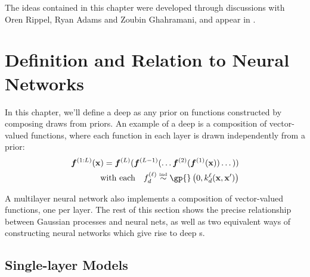 The ideas contained in this chapter were developed through discussions with Oren Rippel, Ryan Adams and Zoubin Ghahramani, and appear in \citet{DuvRipAdaGha14}.



\section{Definition and Relation to Neural Networks}
\label{sec:relating}

In this chapter, we'll define a deep \gp{} as any prior on functions constructed by composing draws from \gp{} priors.
An example of a deep \gp{} is a composition of vector-valued functions, where each function in each layer is drawn independently from a \gp{} prior:
%
\begin{align}
\vf^{(1:L)}(\vx) = \vf^{(L)}(\vf^{(L-1)}(\dots \vf^{(2)}(\vf^{(1)}(\vx)) \dots)) \\
\textnormal{with each} \quad f_d^{(\layerindex)}  \simind \gp{} \left( 0, k^\layerindex_d(\vx, \vx') \right) \nonumber
\label{eq:deep-gp}
\end{align}
%

A multilayer neural network also implements a composition of vector-valued functions, one per layer.
The rest of this section shows the precise relationship between Gaussian processes and neural nets, as well as two equivalent ways of constructing neural networks which give rise to deep \gp{}s.


\subsection{Single-layer Models}

